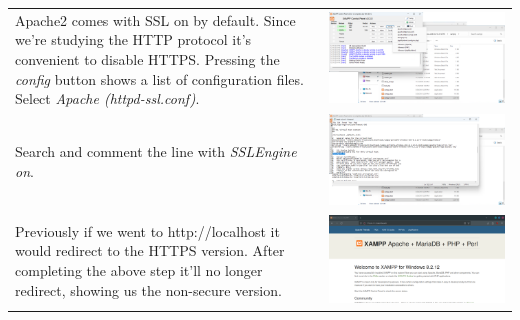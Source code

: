 \documentclass[11pt,a4paper]{report}
\begin{document}
\begin{tabular}{ l r }
            Apache2 comes with SSL on by default. Since we're studying the
            HTTP protocol it's convenient to disable HTTPS.
            Pressing the \textit{config} button shows a list of
            configuration files. Select \textit{Apache (httpd-ssl.conf)}.   & \includegraphics[scale=0.3]{install_xampp15} \\

            Search and comment the line with \textit{SSLEngine on}.         & \includegraphics[scale=0.3]{install_xampp16} \\

            Previously if we went to http://localhost it would redirect
            to the HTTPS version. After completing the above step it'll no
            longer redirect, showing us the non-secure version.             & \includegraphics[scale=0.3]{install_xampp17} \\
        \end{tabular}
\end{document}
